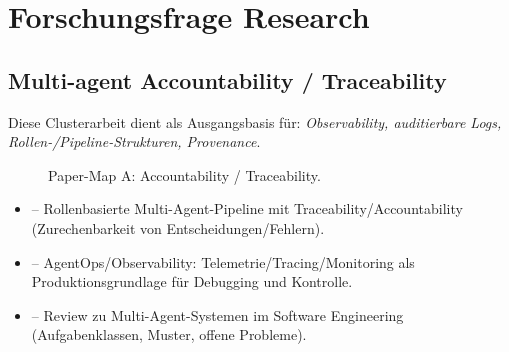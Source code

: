 \section{Forschungsfrage Research}

\subsection{Multi-agent Accountability / Traceability}
Diese Clusterarbeit dient als Ausgangsbasis für: \emph{Observability, auditierbare Logs, Rollen-/Pipeline-Strukturen, Provenance}.

\begin{figure}[htbp]
\centering
{}
\caption{Paper-Map A: Accountability / Traceability.}
\label{fig:paper-map-a}
\end{figure}

\begin{itemize}
  \item \cite{barrak2025traceability_accountability_multiagent} -- Rollenbasierte Multi-Agent-Pipeline mit Traceability/Accountability (Zurechenbarkeit von Entscheidungen/Fehlern).
  \item \cite{dong2024agentops_observability} -- AgentOps/Observability: Telemetrie/Tracing/Monitoring als Produktionsgrundlage für Debugging und Kontrolle.
  \item \cite{he2024llm_multiagent_se_review} -- Review zu Multi-Agent-Systemen im Software Engineering (Aufgabenklassen, Muster, offene Probleme).
\end{itemize}

